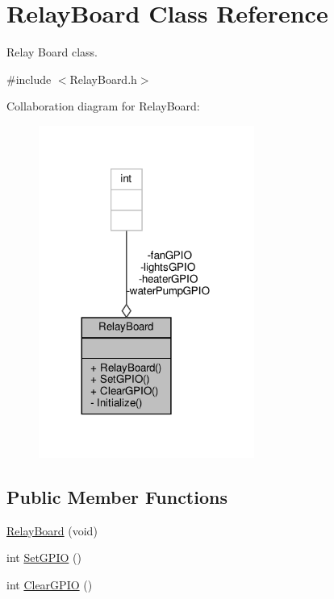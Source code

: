 \hypertarget{classRelayBoard}{}\section{Relay\+Board Class Reference}
\label{classRelayBoard}


Relay Board class.  




{\ttfamily \#include $<$Relay\+Board.\+h$>$}



Collaboration diagram for Relay\+Board\+:\nopagebreak
\begin{figure}[H]
\begin{center}
\leavevmode
\includegraphics[width=200pt]{classRelayBoard__coll__graph}
\end{center}
\end{figure}
\subsection*{Public Member Functions}
\begin{DoxyCompactItemize}
\item 
\hyperlink{classRelayBoard_aa788c15cfc95188f5935f9d9d9fe86d2}{Relay\+Board} (void)
\item 
int \hyperlink{classRelayBoard_a681cd840b5406b0f5d285b4aed94ef2c}{Set\+G\+P\+IO} ()
\item 
int \hyperlink{classRelayBoard_a0dcfab8a5d558c5af4f8deeee510d314}{Clear\+G\+P\+IO} ()
\end{DoxyCompactItemize}
